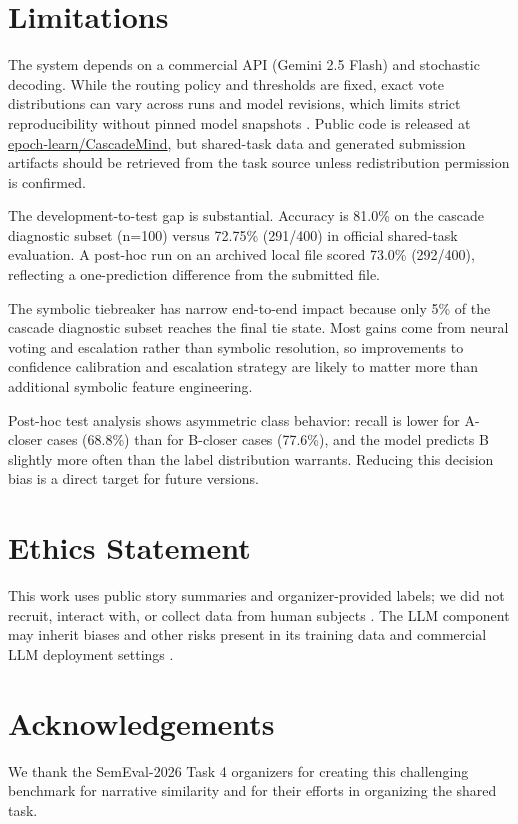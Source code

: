 \documentclass[11pt]{article}
\begin{document}
\section*{Limitations}

The system depends on a commercial API (Gemini 2.5 Flash) and stochastic decoding. While the routing policy and thresholds are fixed, exact vote distributions can vary across runs and model revisions, which limits strict reproducibility without pinned model snapshots \citep{pineau2021reproducibility,chen2024chatgptbehavior}. Public code is released at \href{https://github.com/epoch-learn/CascadeMind}{epoch-learn/CascadeMind}, but shared-task data and generated submission artifacts should be retrieved from the task source unless redistribution permission is confirmed.

The development-to-test gap is substantial. Accuracy is 81.0\% on the cascade diagnostic subset (n=100) versus 72.75\% (291/400) in official shared-task evaluation. A post-hoc run on an archived local file scored 73.0\% (292/400), reflecting a one-prediction difference from the submitted file.

The symbolic tiebreaker has narrow end-to-end impact because only 5\% of the cascade diagnostic subset reaches the final tie state. Most gains come from neural voting and escalation rather than symbolic resolution, so improvements to confidence calibration and escalation strategy are likely to matter more than additional symbolic feature engineering.

Post-hoc test analysis shows asymmetric class behavior: recall is lower for A-closer cases (68.8\%) than for B-closer cases (77.6\%), and the model predicts B slightly more often than the label distribution warrants. Reducing this decision bias is a direct target for future versions.

\section*{Ethics Statement}

This work uses public story summaries and organizer-provided labels; we did not recruit, interact with, or collect data from human subjects \citep{hatzel-etal-2026-semeval,narrative-similarity-dataset-2026}. The LLM component may inherit biases and other risks present in its training data and commercial LLM deployment settings \citep{weidinger2022taxonomy}.

\section*{Acknowledgements}

We thank the SemEval-2026 Task 4 organizers \citep{hatzel-etal-2026-semeval,narrative-similarity-dataset-2026} for creating this challenging benchmark for narrative similarity and for their efforts in organizing the shared task.


\end{document}
